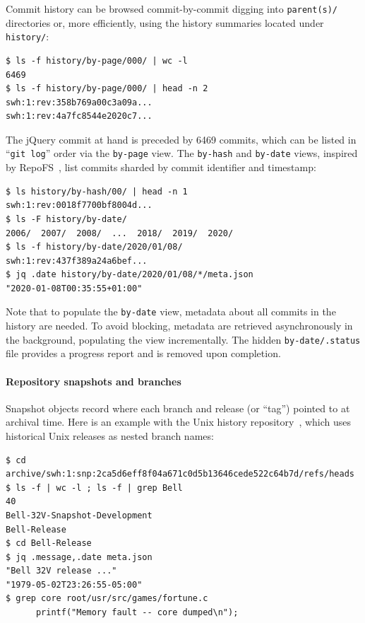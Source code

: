Commit history can be browsed commit-by-commit digging into \texttt{parent(s)/}
directories or, more efficiently, using the history summaries located under
\texttt{history/}:

\begin{verbatim}
$ ls -f history/by-page/000/ | wc -l
6469
$ ls -f history/by-page/000/ | head -n 2
swh:1:rev:358b769a00c3a09a...
swh:1:rev:4a7fc8544e2020c7...
\end{verbatim}

The jQuery commit at hand is preceded by \num{6469} commits, which can be
listed in ``\texttt{git log}'' order via the \texttt{by-page} view. The
\texttt{by-hash} and \texttt{by-date} views, inspired by
RepoFS~\cite{spinellis2019repofs}, list commits sharded by commit identifier
and timestamp:

\begin{verbatim}
$ ls history/by-hash/00/ | head -n 1
swh:1:rev:0018f7700bf8004d...
$ ls -F history/by-date/
2006/  2007/  2008/  ...  2018/  2019/  2020/
$ ls -f history/by-date/2020/01/08/
swh:1:rev:437f389a24a6bef...
$ jq .date history/by-date/2020/01/08/*/meta.json
"2020-01-08T00:35:55+01:00"
\end{verbatim}

Note that to populate the \texttt{by-date} view, metadata about all commits in
the history are needed. To avoid blocking, metadata are retrieved asynchronously
in the background, populating the view incrementally. The hidden
\texttt{by-date/.status} file provides a progress report and is removed upon
completion.


\paragraph{Repository snapshots and branches}

Snapshot objects record where each branch and release (or ``tag'') pointed to
at archival time. Here is an example with the Unix history
repository~\cite{SpinellisUnix2017}, which uses historical Unix releases as
nested branch names:

\begin{verbatim}
$ cd archive/swh:1:snp:2ca5d6eff8f04a671c0d5b13646cede522c64b7d/refs/heads
$ ls -f | wc -l ; ls -f | grep Bell
40
Bell-32V-Snapshot-Development
Bell-Release
$ cd Bell-Release
$ jq .message,.date meta.json
"Bell 32V release ..."
"1979-05-02T23:26:55-05:00"
$ grep core root/usr/src/games/fortune.c
      printf("Memory fault -- core dumped\n");
\end{verbatim}

